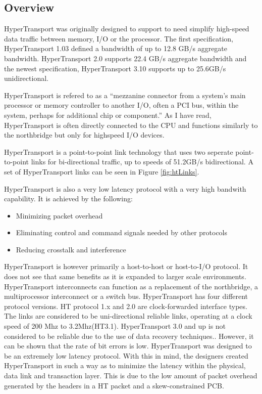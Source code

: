 \documentclass[conference]{IEEEtran}
\begin{document}
\subsection{Overview}
\label{subsec:ht:over}
HyperTransport was originally designed to support to need simplify high-speed
data traffic between memory, I/O or the processor. The first
specification, HyperTransport 1.03 defined a bandwidth of up
to 12.8 GB/s aggregate bandwidth.\cite{htWhitePaper} HyperTransport 2.0
supports 22.4 GB/s aggregate bandwidth and the newest specification,
HyperTransport 3.10 supports up to 25.6GB/s unidirectional.

HyperTransport is refered to as a ``mezzanine connector from a system's main
processor or memory controller to another I/O, often a PCI bus, within the
system, perhaps for additional chip or component.''\cite{paulson2003ins} As I
have read, HyperTransport is often directly connected to the CPU and functions
similarly to the northbridge but only for highspeed I/O devices. 

HyperTransport is a point-to-point link technology that uses two seperate
point-to-point links for bi-directional traffic, up to speeds of 51.2GB/s
bidirectional. A set of HyperTransport links can be seen in Figure
\ref{fig:htLinks}. 

HyperTransport is also a very low latency protocol with a very high bandwith
capability. It is achieved by the following:\cite{duato2009extending}

\begin{itemize}
  \item Minimizing packet overhead
  \item Eliminating control and command signals needed by other protocols
  \item Reducing crosstalk and interference
\end{itemize}

HyperTransport is however primarily a host-to-host or host-to-I/O protocol. It
does not see that same benefits as it is expanded to larger scale
environments. HyperTransport interconnects can function as a replacement of the
northbridge,  a multiprocessor interconnect or a switch bus. 
HyperTransport has four different protocol versions. HT protocol 1.x and 2.0
are clock-forwarded interface types. The links are considered to be
uni-directional reliable links, operating at a clock speed of 200 Mhz to 3.2Mhz(HT3.1).
HyperTransport 3.0 and up is not considered to be reliable due to the use of
data recovery techniques.\cite{holden2006latency}. However, it can be shown that
the rate of bit errors is low. 
HyperTransport was designed to be an extremely low latency protocol. With this
in mind, the designers created HyperTransport in such a way as to minimize the
latency within the physical, data link and transaction layer. This is due to
the low amount of packet overhead generated by the headers in a HT packet and a
skew-constrained PCB.
\end{document}

